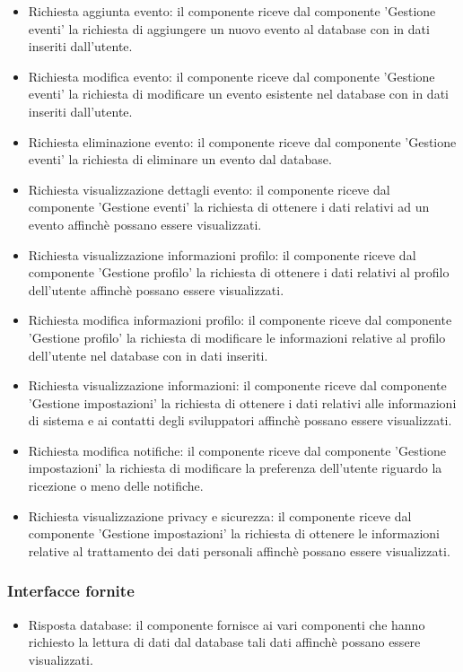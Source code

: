 \documentclass[a4paper,12pt]{article}
\begin{document}
\begin{itemize}
\item {\sffamily Richiesta aggiunta evento}:  il componente riceve dal componente 'Gestione eventi' la richiesta di aggiungere un nuovo evento al database con in dati inseriti dall'utente.
\item {\sffamily Richiesta modifica evento}: il componente riceve dal componente 'Gestione eventi' la richiesta di modificare un evento esistente nel database con in dati inseriti dall'utente.
\item {\sffamily Richiesta eliminazione evento}: il componente riceve dal componente 'Gestione eventi' la richiesta di eliminare un evento dal database.
\item {\sffamily Richiesta visualizzazione dettagli evento}: il componente riceve dal componente 'Gestione eventi' la richiesta di ottenere i dati relativi ad un evento affinchè possano essere visualizzati.
\item {\sffamily Richiesta visualizzazione informazioni profilo}: il componente riceve dal componente 'Gestione profilo' la richiesta di ottenere i dati relativi al profilo dell'utente affinchè possano essere visualizzati.
\item {\sffamily Richiesta modifica informazioni profilo}: il componente riceve dal componente 'Gestione profilo' la richiesta di modificare le informazioni relative al profilo dell'utente nel database con in dati inseriti.
\item {\sffamily Richiesta visualizzazione informazioni}: il componente riceve dal componente 'Gestione impostazioni' la richiesta di ottenere i dati relativi alle informazioni di sistema e ai contatti degli sviluppatori affinchè possano essere visualizzati.
\item {\sffamily Richiesta modifica notifiche}: il componente riceve dal componente 'Gestione impostazioni' la richiesta di modificare la preferenza dell'utente riguardo la ricezione o meno delle notifiche.
\item {\sffamily Richiesta visualizzazione privacy e sicurezza}: il componente riceve dal componente 'Gestione impostazioni' la richiesta di ottenere le informazioni relative al trattamento dei dati personali affinchè possano essere visualizzati.



\end{itemize}

\subsubsection*{Interfacce fornite}
\begin{itemize} \setlength\itemsep{0.01em}
\item {\sffamily Risposta database}: il componente fornisce ai vari componenti che hanno richiesto la lettura di dati dal database tali dati affinchè possano essere visualizzati.

\end{itemize}
\end{document}
